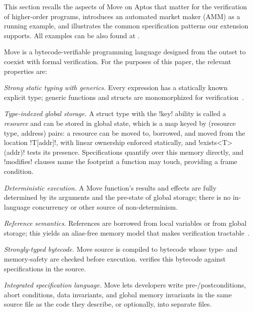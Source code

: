 \label{sec:move-hof}

This section recalls the aspects of Move on Aptos \cite{MoveOnAptosBook} that matter for the verification of higher-order programs, introduces an automated market maker (AMM) as a running example, and illustrates the common specification patterns our extension supports.
All examples can be also found at \cite{PaperExamples}.

 \label{sec:move}

Move is a bytecode-verifiable programming language designed from the outset to coexist with formal verification.
For the purposes of this paper, the relevant properties are:

\begin{Itemize}
    \item \emph{Strong static typing with generics.}  Every expression has a statically known explicit type; generic functions and structs are monomorphized for verification~\cite{DillGPQXZ22}.


    \item \emph{Type-indexed global storage.}  A struct type with the !key! ability is called a \emph{resource} and can be stored in global state, which is a map keyed by (resource type, address) pairs: a resource can be moved to, borrowed, and moved from the location !T[addr]!, with linear ownership enforced statically, and !exists<T>(addr)! tests its presence.  Specifications quantify over this memory directly, and !modifies! clauses name the footprint a function may touch, providing a frame condition.

    \item \emph{Deterministic execution.}  A Move function's results and effects are fully determined by its arguments and the pre-state of global storage; there is no in-language concurrency or other source of non-determinism.

    \item \emph{Reference semantics.}  References are borrowed from local variables or from global storage; this yields an alias-free memory model that makes verification tractable~\cite{DillGPQXZ22}.

    \item \emph{Strongly-typed bytecode.}  Move source is compiled to bytecode whose type- and memory-safety are checked before execution.  \MVP verifies this bytecode against specifications in the source.

    \item \emph{Integrated specification language.}  Move lets developers write pre-/postconditions, abort conditions, data invariants, and global memory invariants in the same source file as the code they describe, or optionally,
    into separate files.
\end{Itemize}


